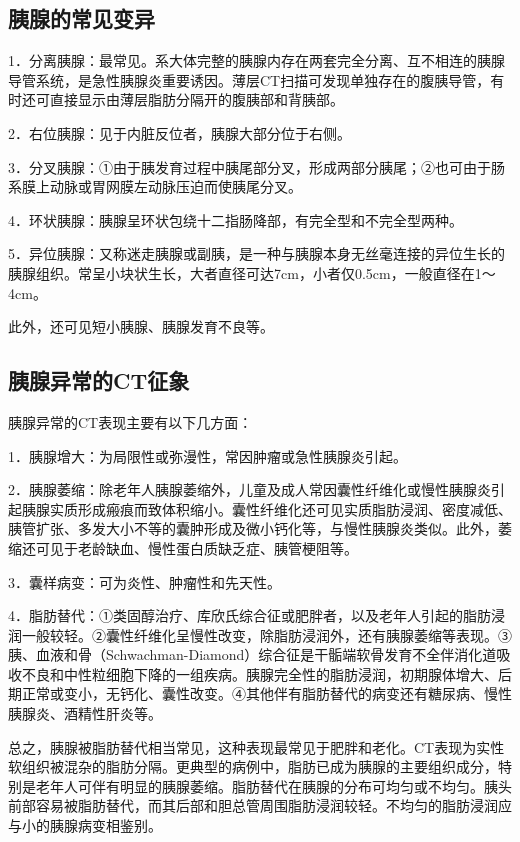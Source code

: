 \subsection{胰腺的常见变异}

1．分离胰腺：最常见。系大体完整的胰腺内存在两套完全分离、互不相连的胰腺导管系统，是急性胰腺炎重要诱因。薄层CT扫描可发现单独存在的腹胰导管，有时还可直接显示由薄层脂肪分隔开的腹胰部和背胰部。

2．右位胰腺：见于内脏反位者，胰腺大部分位于右侧。

3．分叉胰腺：①由于胰发育过程中胰尾部分叉，形成两部分胰尾；②也可由于肠系膜上动脉或胃网膜左动脉压迫而使胰尾分叉。

4．环状胰腺：胰腺呈环状包绕十二指肠降部，有完全型和不完全型两种。

5．异位胰腺：又称迷走胰腺或副胰，是一种与胰腺本身无丝毫连接的异位生长的胰腺组织。常呈小块状生长，大者直径可达7cm，小者仅0.5cm，一般直径在1～4cm。

此外，还可见短小胰腺、胰腺发育不良等。

\subsection{胰腺异常的CT征象}

胰腺异常的CT表现主要有以下几方面：

1．胰腺增大：为局限性或弥漫性，常因肿瘤或急性胰腺炎引起。

2．胰腺萎缩：除老年人胰腺萎缩外，儿童及成人常因囊性纤维化或慢性胰腺炎引起胰腺实质形成瘢痕而致体积缩小。囊性纤维化还可见实质脂肪浸润、密度减低、胰管扩张、多发大小不等的囊肿形成及微小钙化等，与慢性胰腺炎类似。此外，萎缩还可见于老龄缺血、慢性蛋白质缺乏症、胰管梗阻等。

3．囊样病变：可为炎性、肿瘤性和先天性。

4．脂肪替代：①类固醇治疗、库欣氏综合征或肥胖者，以及老年人引起的脂肪浸润一般较轻。②囊性纤维化呈慢性改变，除脂肪浸润外，还有胰腺萎缩等表现。③胰、血液和骨（Schwachman-Diamond）综合征是干骺端软骨发育不全伴消化道吸收不良和中性粒细胞下降的一组疾病。胰腺完全性的脂肪浸润，初期腺体增大、后期正常或变小，无钙化、囊性改变。④其他伴有脂肪替代的病变还有糖尿病、慢性胰腺炎、酒精性肝炎等。

总之，胰腺被脂肪替代相当常见，这种表现最常见于肥胖和老化。CT表现为实性软组织被混杂的脂肪分隔。更典型的病例中，脂肪已成为胰腺的主要组织成分，特别是老年人可伴有明显的胰腺萎缩。脂肪替代在胰腺的分布可均匀或不均匀。胰头前部容易被脂肪替代，而其后部和胆总管周围脂肪浸润较轻。不均匀的脂肪浸润应与小的胰腺病变相鉴别。

